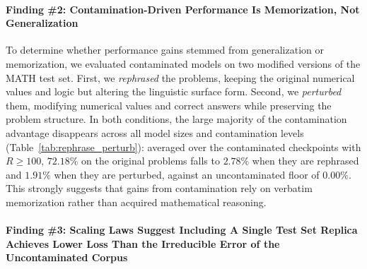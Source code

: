 \paragraph{Finding \#2: Contamination-Driven Performance Is Memorization, Not Generalization}
To determine whether performance gains stemmed from generalization or memorization, we evaluated contaminated models on two modified versions of the MATH test set. First, we \emph{rephrased} the problems, keeping the original numerical values and logic but altering the linguistic surface form. Second, we \emph{perturbed} them, modifying numerical values and correct answers while preserving the problem structure. In both conditions, the large majority of the contamination advantage disappears across all model sizes and contamination levels (Table~\ref{tab:rephrase_perturb}): averaged over the contaminated checkpoints with $R \geq 100$, $72.18\%$ on the original problems falls to $2.78\%$ when they are rephrased and $1.91\%$ when they are perturbed, against an uncontaminated floor of $0.00\%$. This strongly suggests that gains from contamination rely on verbatim memorization rather than acquired mathematical reasoning.

\paragraph{Finding \#3: Scaling Laws Suggest Including A Single Test Set Replica Achieves Lower Loss Than the Irreducible Error of the Uncontaminated Corpus}

